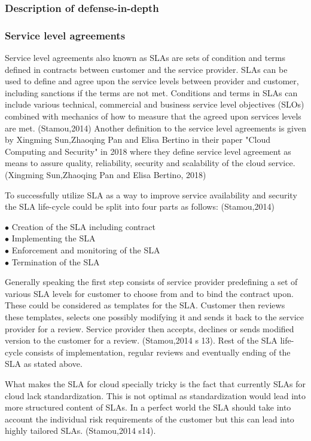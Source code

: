 \documentclass{article}
\begin{document}
\subsubsection{Description of defense-in-depth}
\subsubsection{Service level agreements}
Service level agreements also known as SLAs are sets of condition and terms defined in contracts between customer and the service provider. SLAs can be used to define and agree upon the service levels between provider and customer, including sanctions if the terms are not met. Conditions and terms in SLAs can include various technical, commercial and business service level objectives (SLOs) combined with mechanics of how to measure that the agreed upon services levels are met. (Stamou,2014) Another definition to the service level agreements is given by Xingming Sun,Zhaoqing Pan and Elisa Bertino in their paper "Cloud Computing and Security" in 2018 where they define service level agreement as means to assure quality, reliability, security and scalability of the cloud service. (Xingming Sun,Zhaoqing Pan and Elisa Bertino, 2018) 
\par
To successfully utilize SLA as a way to improve service availability and security the SLA life-cycle could be split into four parts as follows: (Stamou,2014)
\begin{description}
        \item[$\bullet$ Creation of the SLA including contract]
        \item[$\bullet$ Implementing the SLA]
        \item[$\bullet$ Enforcement and monitoring of the SLA]
        \item[$\bullet$ Termination of the SLA]
\end{description}
Generally speaking the first step consists of service provider predefining a set of various SLA levels for customer to choose from and to bind the contract upon. These could be considered as templates for the SLA. Customer then reviews these templates, selects one possibly modifying it and sends it back to the service provider for a review. Service provider then accepts, declines or sends modified version to the customer for a review. (Stamou,2014 s 13). Rest of the SLA life-cycle consists of implementation, regular reviews and eventually ending of the SLA as stated above.
\par
What makes the SLA for cloud specially tricky is the fact that currently SLAs for cloud lack standardization. This is not optimal as standardization would lead into more structured content of SLAs. In a perfect world the SLA should take into account the individual risk requirements of the customer but this can lead into highly tailored SLAs. (Stamou,2014 s14).
\end{document}
